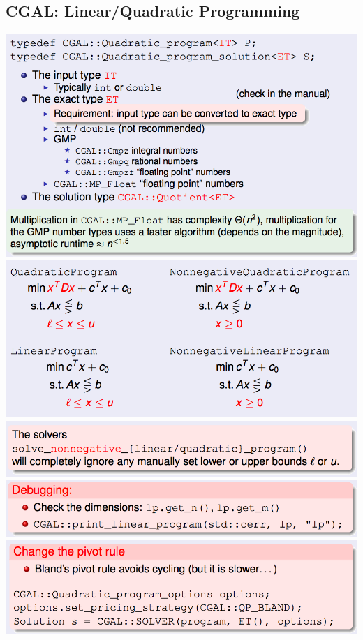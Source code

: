 \documentclass[a4paper,titlepage]{article}
\begin{document}
\subsection{CGAL: Linear/Quadratic Programming}
\includegraphics{_useful-snippets/lp_qp0.png}\\
\includegraphics{_useful-snippets/lp_qp1.png}\\
\includegraphics{_useful-snippets/lp_qp2.png}\\
\includegraphics{_useful-snippets/lp_qp3.png}\\
\includegraphics{_useful-snippets/lp_qp4.png}\\
\end{document}
